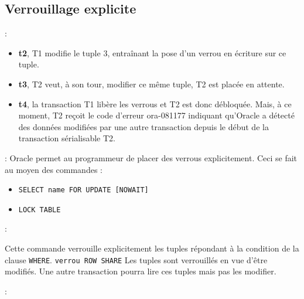 \documentclass[10pt]{beamer}
\begin{document}
\subsection{Verrouillage explicite}
\begin{frame}{\secname : \subsecname}
    \begin{itemize}
        \item \textbf{t2}, T1 modifie le tuple 3, entraînant la pose d'un verrou en écriture sur ce tuple.
        \item \textbf{t3}, T2 veut, à son tour, modifier ce même tuple, T2 est placée en attente.
        \item \textbf{t4}, la transaction T1 libère les verrous et T2 est donc débloquée. Mais, à ce moment, T2 reçoit le code d'erreur ora-081177 indiquant qu'Oracle a détecté des données modifiées par une autre transaction depuis le début de la transaction sérialisable T2.
    \end{itemize}
\end{frame}

\begin{frame}{\secname : \subsecname}
    Oracle permet au programmeur de placer des verrous explicitement. Ceci se fait au moyen des commandes :
    \begin{itemize}
        \item \lstinline[language=plsql]!SELECT name FOR UPDATE [NOWAIT]!
        \item \lstinline[language=plsql]!LOCK TABLE!
    \end{itemize}
\end{frame}

\begin{frame}{\secname : \subsecname}
    
    Cette commande verrouille explicitement les tuples répondant à la condition de la clause \lstinline[language=plsql]!WHERE!.
    \lstinline[language=plsql]!verrou ROW SHARE!
    Les tuples sont verrouillés en vue d'être modifiés.  Une autre transaction pourra lire ces tuples mais pas les modifier.
\end{frame}

\begin{frame}{\secname : \subsecname}
    
\end{frame}
\end{document}
